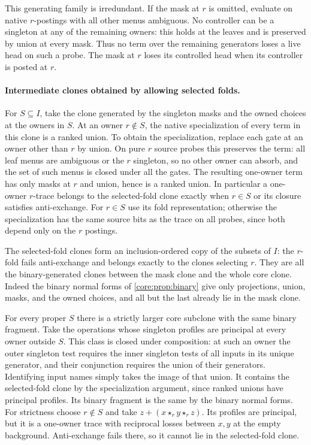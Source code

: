 This generating family is irredundant. If the mask at
$r$ is omitted, evaluate on native $r$-postings with all
other menus ambiguous. No controller can be a singleton
at any of the remaining owners: this holds at the leaves
and is preserved by union at every mask. Thus no term
over the remaining generators loses a live head on such
a probe. The mask at $r$ loses its controlled head when
its controller is posted at $r$.

\paragraph{Intermediate clones obtained by allowing selected folds.}
For $S\subseteq I$, take the clone generated by the singleton
masks and the owned choices at the owners in $S$.
At an owner $r\notin S$, the native specialization of
every term in this clone is a ranked union. To obtain the
specialization, replace each gate at an owner other than
$r$ by union. On pure $r$ source probes this preserves
the term: all leaf menus are ambiguous or the $r$ singleton,
so no other owner can absorb, and the set of such menus
is closed under all the gates. The resulting one-owner
term has only masks at $r$ and union, hence is a ranked
union. In particular a one-owner $r$-trace belongs to the
selected-fold clone exactly when $r\in S$ or its closure
satisfies anti-exchange. For $r\in S$ use its fold
representation; otherwise the specialization has the
same source bits as the trace on all probes, since both
depend only on the $r$ postings.

The selected-fold clones form an inclusion-ordered copy of
the subsets of $I$: the $r$-fold fails anti-exchange and
belongs exactly to the clones selecting $r$. They are all
the binary-generated clones between the mask clone and
the whole core clone. Indeed the binary normal forms
of \cref{core:prop:binary} give only projections, union,
masks, and the owned choices, and all but the last already
lie in the mask clone.

For every proper $S$ there is a strictly larger core
subclone with the same binary fragment. Take the operations
whose singleton profiles are principal at every owner
outside $S$. This class is closed under composition:
at such an owner the outer singleton test requires the
inner singleton tests of all inputs in its unique
generator, and their conjunction requires the union
of their generators. Identifying input names simply
takes the image of that union. It contains the
selected-fold clone by the specialization argument,
since ranked unions have principal profiles. Its binary
fragment is the same by the binary normal forms.
For strictness choose $r\notin S$ and take
$z+(x\star_r y\star_r z)$. Its profiles are principal,
but it is a one-owner trace with reciprocal losses
between $x,y$ at the empty background. Anti-exchange
fails there, so it cannot lie in the selected-fold clone.

